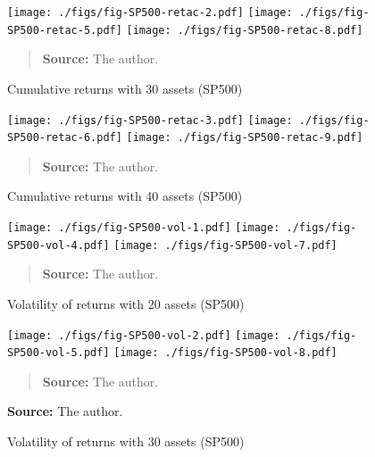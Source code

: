 \documentclass[12pt,oneside,a4paper]{memoir}
\begin{document}
\begin{figure}[htpb]
\centering
\footnotesize
\caption{Cumulative returns with 30 assets (SP500)}
\label{fig:sp500:ret:30a}
\texttt{[image: ./figs/fig-SP500-retac-2.pdf]}
\texttt{[image: ./figs/fig-SP500-retac-5.pdf]}
\texttt{[image: ./figs/fig-SP500-retac-8.pdf]}
\begin{quote}
\textbf{Source:} The author.
\end{quote}
\end{figure}

\begin{figure}[htpb]
\centering
\footnotesize
\caption{Cumulative returns with 40 assets (SP500)}
\label{fig:sp500:ret:40a}
\texttt{[image: ./figs/fig-SP500-retac-3.pdf]}
\texttt{[image: ./figs/fig-SP500-retac-6.pdf]}
\texttt{[image: ./figs/fig-SP500-retac-9.pdf]}
\begin{quote}
\textbf{Source:} The author.
\end{quote}
\end{figure}


\begin{figure}[htpb]
\centering
\footnotesize
\caption{Volatility of returns with 20 assets (SP500)}
\label{fig:sp500:vol:20a}
\texttt{[image: ./figs/fig-SP500-vol-1.pdf]}
\texttt{[image: ./figs/fig-SP500-vol-4.pdf]}
\texttt{[image: ./figs/fig-SP500-vol-7.pdf]}
\begin{quote}
\textbf{Source:} The author.
\end{quote}
\end{figure}

\begin{figure}[htpb]
\centering
\footnotesize
\caption{Volatility of returns with 30 assets (SP500)}
\label{fig:sp500:vol:30a}
\texttt{[image: ./figs/fig-SP500-vol-2.pdf]}
\texttt{[image: ./figs/fig-SP500-vol-5.pdf]}
\texttt{[image: ./figs/fig-SP500-vol-8.pdf]}
\begin{quote}
\textbf{Source:} The author.
\end{quote}

\textbf{Source:} The author. \\
\end{figure}
\end{document}
